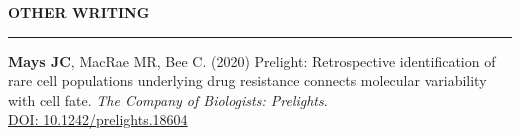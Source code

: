 \documentclass[10pt, letterpaper]{article} %
\newenvironment{CVSection}{
\begin{addmargin}[2em]{0em}
\begin{samepage}}
{\end{samepage}
\end{addmargin}\bigskip}
\newcommand{\CVHeading}[1]{
\MakeUppercase{\bf #1}
\smallskip
\hrule
\medskip
}
\begin{document}
\CVHeading{Other Writing}
\begin{CVSection}
\textbf{Mays JC}, MacRae MR, Bee C. (2020) Prelight: Retrospective identification of rare cell populations underlying drug resistance connects molecular variability with cell fate. \emph{The Company of Biologists: Prelights}.\\
\href{https://doi.org/10.1242/prelights.18604}{DOI: 10.1242/prelights.18604}
\end{CVSection}
\end{document}
